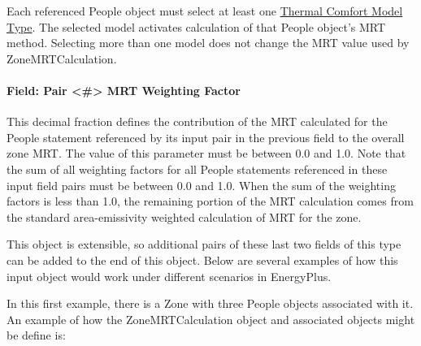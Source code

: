 Each referenced People object must select at least one \hyperref[field-thermal-comfort-model-type-up-to-7-allowed]{Thermal Comfort Model Type}. The selected model activates calculation of that People object's MRT method. Selecting more than one model does not change the MRT value used by ZoneMRTCalculation.

\paragraph{Field: Pair \textless{}\#\textgreater{} MRT Weighting Factor}\label{field-zonemrtcalculation-weightingfactorX}

This decimal fraction defines the contribution of the MRT calculated for the People statement referenced by its input pair in the previous field to the overall zone MRT.  The value of this parameter must be between 0.0 and 1.0.  Note that the sum of all weighting factors for all People statements referenced in these input field pairs must be between 0.0 and 1.0.  When the sum of the weighting factors is less than 1.0, the remaining portion of the MRT calculation comes from the standard area-emissivity weighted calculation of MRT for the zone.

This object is extensible, so additional pairs of these last two fields of this type can be added to the end of this object.  Below are several examples of how this input object would work under different scenarios in EnergyPlus.

In this first example, there is a Zone with three People objects associated with it. An example of how the ZoneMRTCalculation object and associated objects might be define is:

